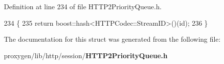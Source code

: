 Definition at line 234 of file H\+T\+T\+P2\+Priority\+Queue.\+h.


\begin{DoxyCode}
234                                                            \{
235         \textcolor{keywordflow}{return} boost::hash<HTTPCodec::StreamID>()(\textcolor{keywordtype}{id});
236       \}
\end{DoxyCode}


The documentation for this struct was generated from the following file\+:\begin{DoxyCompactItemize}
\item 
proxygen/lib/http/session/{\bf H\+T\+T\+P2\+Priority\+Queue.\+h}\end{DoxyCompactItemize}
